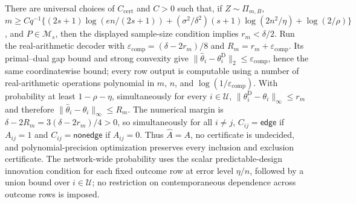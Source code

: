 There are universal choices of \(C_{\mathrm{cert}}\) and \(C>0\) such that, if \(Z\sim\Pi_{m,B}\), \(m\ge Cq^{-1}\{(2s+1)\log(en/(2s+1))+(\sigma^2/\delta^2)(s+1)\log(2n^2/\eta)+\log(2/\rho)\}\), and \(P\in\mathcal M_s\), then the displayed sample-size condition implies \(r_m<\delta/2\). Run the real-arithmetic decoder with \(\varepsilon_{\mathrm{comp}}=(\delta-2r_m)/8\) and \(R_m=r_m+\varepsilon_{\mathrm{comp}}\). Its primal--dual gap bound and strong convexity give \(\lVert\widehat\theta_i-\theta_i^{\mathrm D}\rVert_2\le\varepsilon_{\mathrm{comp}}\), hence the same coordinatewise bound; every row output is computable using a number of real-arithmetic operations polynomial in \(m\), \(n\), and \(\log(1/\varepsilon_{\mathrm{comp}})\). With probability at least \(1-\rho-\eta\), simultaneously for every \(i\in\mathcal U\), \(\lVert\theta_i^{\mathrm D}-\theta_i\rVert_\infty\le r_m\) and therefore \(\lVert\widehat\theta_i-\theta_i\rVert_\infty\le R_m\). The numerical margin is \(\delta-2R_m=3(\delta-2r_m)/4>0\), so simultaneously for all \(i\ne j\), \(C_{ij}=\mathsf{edge}\) if \(A_{ij}=1\) and \(C_{ij}=\mathsf{nonedge}\) if \(A_{ij}=0\). Thus \(\widehat A=A\), no certificate is undecided, and polynomial-precision optimization preserves every inclusion and exclusion certificate. The network-wide probability uses the scalar predictable-design innovation condition for each fixed outcome row at error level \(\eta/n\), followed by a union bound over \(i\in\mathcal U\); no restriction on contemporaneous dependence across outcome rows is imposed.